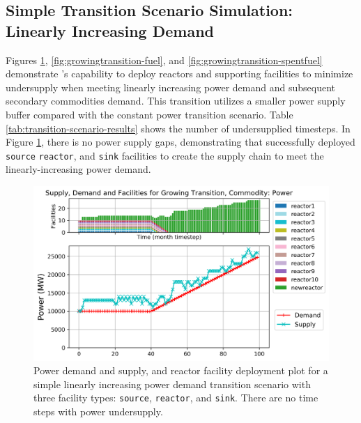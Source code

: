     \subsection{Simple Transition Scenario Simulation: Linearly Increasing Demand}

    Figures \ref{fig:growingtransition-power}, \ref{fig:growingtransition-fuel},
    and \ref{fig:growingtransition-spentfuel} demonstrate \deploy's capability 
    to deploy reactors and supporting facilities to minimize undersupply 
    when meeting linearly increasing power demand and subsequent secondary 
    commodities demand. 
    This transition utilizes a smaller power supply buffer compared with the constant 
    power transition scenario.
    Table \ref{tab:transition-scenario-results} shows the number of 
    undersupplied timesteps. 
    In Figure \ref{fig:growingtransition-power}, there is no power supply gaps, demonstrating that 
    \deploy successfully deployed \texttt{source} \texttt{reactor}, and \texttt{sink} 
    facilities to create the supply chain to meet the linearly-increasing power demand. 
    \begin{figure}[]
        \centering
        \includegraphics[width=0.9\linewidth]{figures/growingtransition-power.png} 
            \caption{Power demand and supply, and reactor facility deployment plot for  
            a simple linearly increasing power demand transition scenario with 
            three facility types: \texttt{source}, \texttt{reactor}, and \texttt{sink}.
            There are no time steps with power undersupply\cite{chee_arfc/transition-scenarios_2018}.}
            \label{fig:growingtransition-power}
    \end{figure}
    
